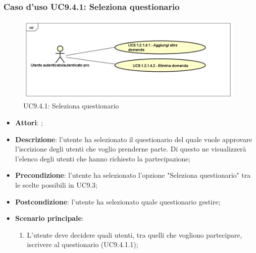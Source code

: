 		 \subsubsection{Caso d'uso UC9.4.1: Seleziona questionario}
		 \label{UC9.4.1}
		 \begin{figure}[h]
		 	\centering
		 	\includegraphics[scale=0.5,keepaspectratio]{UML/UC9_4_1.png}
		 	\caption{UC9.4.1: Seleziona questionario}
		 \end{figure}
		 \FloatBarrier
		 \begin{itemize}
		 	\item \textbf{Attori}: \uaupro;
		 	\item \textbf{Descrizione}: l'utente ha selezionato il questionario del quale vuole approvare l'iscrizione degli utenti che voglio prenderne parte. Di questo ne visualizzerà l'elenco degli utenti che hanno richiesto la partecipazione; 
		 	\item \textbf{Precondizione}: l'utente ha selezionato l'opzione "Seleziona questionario" tra le scelte possibili in UC9.3;
		 	\item \textbf{Postcondizione}: l'utente ha selezionato quale questionario gestire;
		 	\item \textbf{Scenario principale}:
		 	\begin{enumerate}
		 		\item L'utente deve decidere quali utenti, tra quelli che vogliono partecipare, iscrivere al questionario (UC9.4.1.1);
		 	\end{enumerate}
		 \end{itemize}
		 
